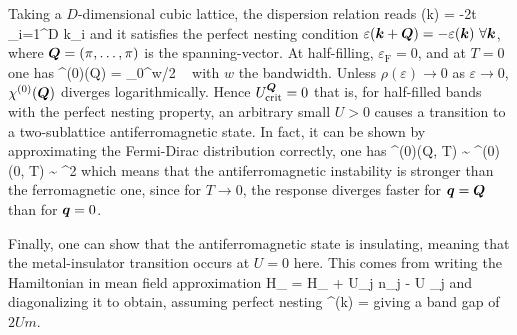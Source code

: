 		Taking a $D$-dimensional cubic lattice, the dispersion relation reads
		\be \varepsilon(\vb* k) = -2t \sum_{i=1}^D \cos k_i \ee
		and it satisfies the perfect nesting condition $ \varepsilon(\vb* k + \vb* Q) =  -\varepsilon(\vb* k) \ \forall \vb* k$, where $\vb* Q = (\pi,\dotsc, \pi)$ is the spanning-vector. At half-filling, $\varepsilon_\text{F} = 0$, and at $T=0$ one has
		\be \chi^{(0)}(\vb* Q) = \int_0^{w/2} \dd \varepsilon \ \frac{\rho(\varepsilon)}{2\varepsilon} \ee
		with $w$ the bandwidth. Unless $\rho(\varepsilon) \to 0$ as $\varepsilon \to 0$, $\chi^{(0)}(\vb* Q)$ diverges logarithmically. Hence $U_\text{crit}^{\vb* Q}=0$ that is, for half-filled bands with the perfect nesting property, an arbitrary small $U>0$ causes a transition to a two-sublattice antiferromagnetic state. In fact, it can be shown by approximating the Fermi-Dirac distribution correctly, one has
		\be \chi^{(0)}(\vb* Q, T) \sim {} \ln {}  \chi^{(0)}(0, T) \sim {} \ln^2  \ee
		which means that the antiferromagnetic instability is stronger than the ferromagnetic one, since for $T\to 0$, the response diverges faster for $\vb* q = \vb* Q$ than for $\vb* q = 0$.

		Finally, one can show that the antiferromagnetic state is insulating, meaning that the metal-insulator transition occurs at $U=0$ here. This comes from writing the Hamiltonian in mean field approximation
		\be \mc H_ = \mc H_ + U\sum_{\vb* j \sigma} n_{\vb* j \sigma}   - U \sum_{\vb* j}   \ee
		and diagonalizing it to obtain, assuming perfect nesting
		\be \lambda^\pm(\vb* k) =  \pm {} \ee
		giving a band gap of $2Um$.